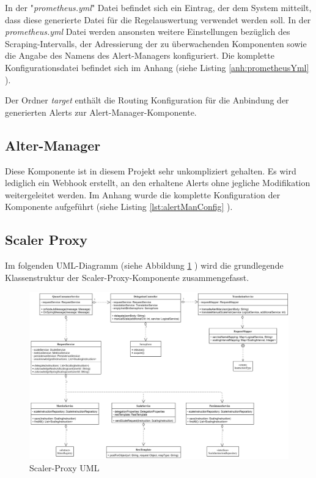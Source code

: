 In der "\emph{prometheus.yml}" Datei befindet sich ein Eintrag, der dem System mitteilt, dass diese generierte Datei für die Regelauswertung verwendet werden soll. In der \emph{prometheus.yml} Datei werden ansonsten weitere Einstellungen bezüglich des Scraping-Intervalls, der Adressierung der zu überwachenden Komponenten sowie die Angabe des Namens des Alert-Managers konfiguriert. Die komplette Konfigurationsdatei befindet sich im Anhang (siehe Listing \ref{anh:prometheusYml} ).

Der Ordner \emph{target} enthält die Routing Konfiguration für die Anbindung der generierten Alerts zur Alert-Manager-Komponente.
\subsection{Alter-Manager}
Diese Komponente ist in diesem Projekt sehr unkompliziert gehalten. Es wird lediglich ein Webhook erstellt, an den erhaltene Alerts ohne jegliche Modifikation weitergeleitet werden. Im Anhang wurde die komplette Konfiguration der Komponente aufgeführt (siehe Listing \ref{lst:alertManConfig} ).


\subsection{Scaler Proxy}

Im folgenden UML-Diagramm (siehe Abbildung \ref{fig:proxyScalerUml} ) wird die grundlegende Klassenstruktur der Scaler-Proxy-Komponente zusammengefasst. 

\begin{figure}[ht!]
	\centering
	\includegraphics[width=\linewidth]{kapitel/problemloesung/implementierung/_img/scaler-proxy-uml}
	\caption[Scaler-Proxy UML]{Scaler-Proxy UML}
	\label{fig:proxyScalerUml}
\end{figure}


